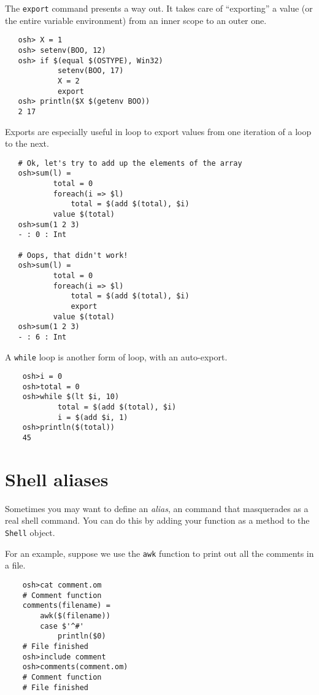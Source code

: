 The \verb+export+ command presents a way out.  It takes care of ``exporting'' a value (or the entire
variable environment) from an inner scope to an outer one.

\begin{verbatim}
   osh> X = 1
   osh> setenv(BOO, 12)
   osh> if $(equal $(OSTYPE), Win32)
            setenv(BOO, 17)
            X = 2
            export
   osh> println($X $(getenv BOO))
   2 17
\end{verbatim}

Exports are especially useful in loop to export values from one iteration of a loop to the next.

\begin{verbatim}
   # Ok, let's try to add up the elements of the array
   osh>sum(l) =
           total = 0
           foreach(i => $l)
               total = $(add $(total), $i)
           value $(total)
   osh>sum(1 2 3)
   - : 0 : Int

   # Oops, that didn't work!
   osh>sum(l) =
           total = 0
           foreach(i => $l)
               total = $(add $(total), $i)
               export
           value $(total)
   osh>sum(1 2 3)
   - : 6 : Int
\end{verbatim}

A \verb+while+ loop is another form of loop, with an auto-export.

\begin{verbatim}
    osh>i = 0
    osh>total = 0
    osh>while $(lt $i, 10)
            total = $(add $(total), $i)
            i = $(add $i, 1)
    osh>println($(total))
    45
\end{verbatim}

\section{Shell aliases}

Sometimes you may want to define an \emph{alias}, an \OMake{} command that masquerades as a real shell
command.  You can do this by adding your function as a method to the \verb+Shell+ object.

For an example, suppose we use the \verb+awk+ function to print out all the comments in a file.

\begin{verbatim}
    osh>cat comment.om
    # Comment function
    comments(filename) =
        awk($(filename))
        case $'^#'
            println($0)
    # File finished
    osh>include comment
    osh>comments(comment.om)
    # Comment function
    # File finished
\end{verbatim}

